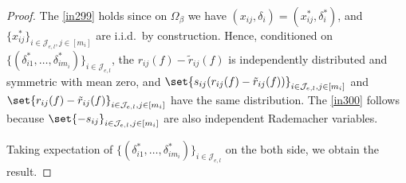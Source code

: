 \documentclass[twoside,11pt]{article}
\begin{document}
\begin{proof}
The \eqref{in299} holds since on $\Omega_\beta$ we have $(x_{ij},\delta_i)=(x_{ij}^*,\delta_i^*)$, and $\{x_{ij}^*\}_{i \in \mathcal{J}_{e,l},j\in[m_{i}]}$ are i.i.d.\ by construction. Hence, conditioned on $\{ ( \delta_{i1}^*, \dots, \delta_{im_i}^*) \}_{i \in \mathcal{J}_{e,l}} $, the $ r_{ij}(f) - \tilde r_{ij}(f)$ is independently distributed and symmetric with mean zero, and $\set{s_{ij}( r_{ij} (f) -  \tilde r_{ij} (f))}_{i \in \mathcal{J}_{e,l},j\in[m_{i}]} $ and $\set{ r_{ij} (f) -  \tilde r_{ij} (f)}_{i \in \mathcal{J}_{e,l},j\in[m_{i}]} $ have the same distribution.
The \eqref{in300} follows because $\set{-s_{ij}}_{i \in \mathcal{J}_{e,l},j\in[m_{i}]} $ are also independent Rademacher variables.


Taking expectation of $\{ ( \delta_{i1}^*, \dots, \delta_{im_i}^*) \}_{i \in \mathcal{J}_{e,l}}$ on the both side, we obtain the result.     
\end{proof}
\end{document}
